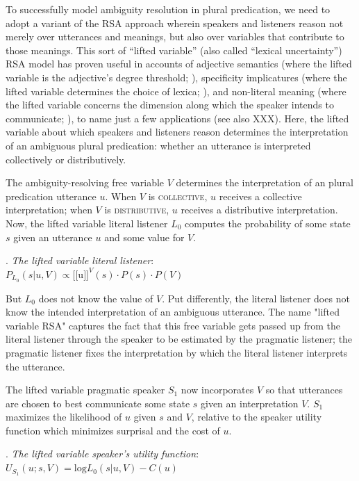 \documentclass[linguex]{sp}
\newcommand{\sem}[1]{\mbox{$[\![$#1$]\!]$}}
\begin{document}
To successfully model ambiguity resolution in plural predication, we need to adopt a variant of the RSA approach wherein speakers and listeners reason not merely over utterances and meanings, but also over variables that contribute to those meanings. This sort of ``lifted variable'' (also called ``lexical uncertainty'') RSA model has proven useful in accounts of adjective semantics (where the lifted variable is the adjective's degree threshold; \citealp{lassitergoodman2013}), specificity implicatures (where the lifted variable determines the choice of lexica; \citealp{bergenetal2012}), and non-literal meaning (where the lifted variable concerns the dimension along which the speaker intends to communicate; \citealp{kaoetal2014}), to name just a few applications (see also XXX). Here, the lifted variable about which speakers and listeners reason determines the interpretation of an ambiguous plural predication: whether an utterance is interpreted collectively or distributively.

The ambiguity-resolving free variable $V$ determines the interpretation of an plural predication utterance $u$. When $V$ is \textsc{collective}, $u$ receives a collective interpretation; when $V$ is \textsc{distributive}, $u$ receives a distributive interpretation. Now, the lifted variable literal listener $L_{0}$ computes the probability of some state $s$ given an utterance $u$ and some value for $V$. 

\ex. \emph{The lifted variable literal listener}:\\
$P_{L_{0}}(s|u,V) \propto \sem{u}^{V}(s) \cdot P(s) \cdot P(V)$

But $L_{0}$ does not know the value of $V$. Put differently, the literal listener does not know the intended interpretation of an ambiguous utterance. The name "lifted variable RSA" captures the fact that this free variable gets passed up from the literal listener through the speaker to be estimated by the pragmatic listener; the pragmatic listener fixes the interpretation by which the literal listener interprets the utterance.

The lifted variable pragmatic speaker $S_{1}$ now incorporates $V$ so that utterances are chosen to best communicate some state $s$ given an interpretation $V$. $S_{1}$ maximizes the likelihood of $u$ given $s$ and $V$, relative to the speaker utility function which minimizes surprisal and the cost of $u$.

\ex. \emph{The lifted variable speaker's utility function}:\\
$U_{S_{1}}(u;s,V) = \textrm{log}L_{0}(s|u,V) - C(u)$
\end{document}
